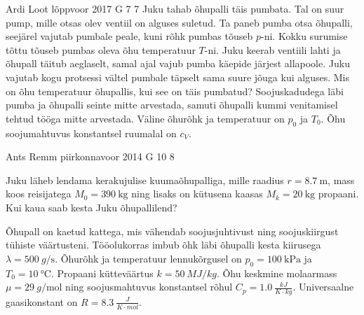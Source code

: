 \documentclass[11pt]{article}
\begin{document}
{%
{Ardi Loot} %
{lõppvoor} %
{2017} %
{G 7} %
{7} %
{
\ifStatement
Juku tahab õhupalli täis pumbata. Tal on suur pump, mille otsas olev ventiil on alguses suletud. Ta paneb pumba otsa õhupalli, seejärel vajutab pumbale peale, kuni rõhk pumbas tõuseb $p$-ni. Kokku surumise tõttu tõuseb pumbas oleva õhu temperatuur $T$-ni. Juku keerab ventiili lahti ja õhupall täitub aeglaselt, samal ajal vajub pumba käepide järjest allapoole. Juku vajutab kogu protsessi vältel pumbale täpselt sama suure jõuga kui alguses. Mis on õhu temperatuur õhupallis, kui see on täis pumbatud? Soojuskadudega läbi pumba ja õhupalli seinte mitte arvestada, samuti õhupalli kummi venitamisel tehtud tööga mitte arvestada. Väline õhurõhk ja temperatuur on $p_0$ ja $T_0$. Õhu soojumahtuvus konstantsel ruumalal on $c_V$.
\fi
}

{Ants Remm} %
{piirkonnavoor} %
{2014} %
{G 10} %
{8} %
{
\ifStatement
Juku läheb lendama kerakujulise kuumaõhupalliga, mille raadius $r = \SI{8.7}{\metre}$, mass koos reisijatega $M_0= \SI{390}{\kg}$ ning lisaks on kütusena kaasas $M_k = \SI{20}{\kg}$ propaani. Kui kaua saab kesta Juku õhupallilend? 

Õhupall on kaetud kattega, mis vähendab soojusjuhtivust ning soojuskiirgust tühiste väärtusteni. Tööolukorras imbub õhk läbi õhupalli kesta kiirusega $\lambda = \SI{500}{g\per\s}$. Õhurõhk ja temperatuur lennukõrgusel on $p_0 = \SI{100}{\kilo\Pa}$ ja $T_0 = \SI{10}{\celsius}$. Propaani kütteväärtus $k = \SI{50}{MJ/kg}$. Õhu keskmine molaarmass $\mu = \SI{29}{g\per\mole}$ ning soojusmahtuvus konstantsel rõhul $C_p = \SI{1.0}{\frac{kJ}{K\cdot kg}}$. Universaalne gaasikonstant on $R = \SI{8.3}{\frac{J}{K\cdot mol}}$.
\fi
}

}
\end{document}
